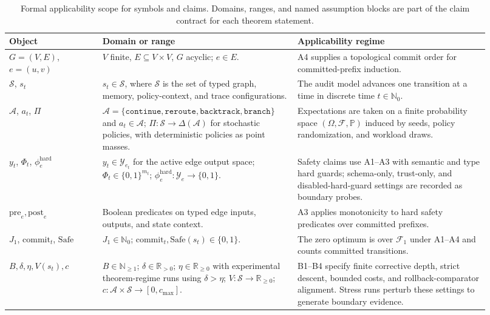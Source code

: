 \documentclass{article} %
\begin{document}
\begin{table}[t]
\caption{Formal applicability scope for symbols and claims. Domains, ranges, and named assumption blocks are part of the claim contract for each theorem statement.}
\label{tab:formal_scope}
\centering
\scriptsize
\renewcommand{\arraystretch}{1.15}
\setlength{\tabcolsep}{3pt}
\begin{tabular}{p{0.18\linewidth}p{0.37\linewidth}p{0.37\linewidth}}
\hline
Object & Domain or range & Applicability regime \\
\hline
$G=(V,E)$, $e=(u,v)$ & $V$ finite, $E\subseteq V\times V$, $G$ acyclic; $e\in E$. & A4 supplies a topological commit order for committed-prefix induction. \\
$\mathcal{S}$, $s_t$ & $s_t\in\mathcal{S}$, where $\mathcal{S}$ is the set of typed graph, memory, policy-context, and trace configurations. & The audit model advances one transition at a time in discrete time $t\in\mathbb{N}_0$. \\
$\mathcal{A}$, $a_t$, $\Pi$ & $\mathcal{A}=\{\texttt{continue},\texttt{reroute},\texttt{backtrack},\texttt{branch}\}$ and $a_t\in\mathcal{A}$; $\Pi:\mathcal{S}\to\Delta(\mathcal{A})$ for stochastic policies, with deterministic policies as point masses. & Expectations are taken on a finite probability space $(\Omega,\mathcal{F},\mathbb{P})$ induced by seeds, policy randomization, and workload draws. \\
$y_t$, $\Phi_t$, $\phi_e^{\mathrm{hard}}$ & $y_t\in\mathcal{Y}_{e_t}$ for the active edge output space; $\Phi_t\in\{0,1\}^{m_t}$; $\phi_e^{\mathrm{hard}}:\mathcal{Y}_e\to\{0,1\}$. & Safety claims use A1--A3 with semantic and type hard guards; schema-only, trust-only, and disabled-hard-guard settings are recorded as boundary probes. \\
$\mathrm{pre}_e,\mathrm{post}_e$ & Boolean predicates on typed edge inputs, outputs, and state context. & A3 applies monotonicity to hard safety predicates over committed prefixes. \\
$J_1$, $\mathrm{commit}_t$, $\mathrm{Safe}$ & $J_1\in\mathbb{N}_0$; $\mathrm{commit}_t,\mathrm{Safe}(s_t)\in\{0,1\}$. & The zero optimum is over $\mathcal{F}_1$ under A1--A4 and counts committed transitions. \\
$B,\delta,\eta,V(s_t),c$ & $B\in\mathbb{N}_{\ge1}$; $\delta\in\mathbb{R}_{>0}$; $\eta\in\mathbb{R}_{\ge0}$ with experimental theorem-regime runs using $\delta>\eta$; $V:\mathcal{S}\to\mathbb{R}_{\ge0}$; $c:\mathcal{A}\times\mathcal{S}\to[0,c_{\max}]$. & B1--B4 specify finite corrective depth, strict descent, bounded costs, and rollback-comparator alignment. Stress runs perturb these settings to generate boundary evidence. \\

\end{tabular}
\end{table}
\end{document}
